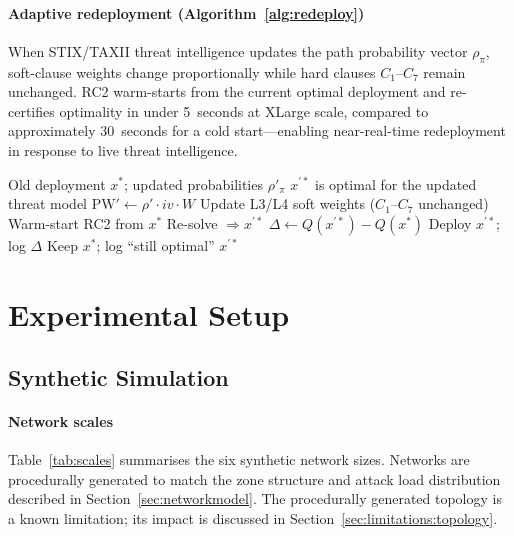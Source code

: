 \documentclass[journal]{IEEEtran}
\begin{document}
\paragraph{Adaptive redeployment (Algorithm~\ref{alg:redeploy})}
When STIX/TAXII threat intelligence updates the path probability
vector $\rho_\pi$, soft-clause weights change proportionally while
hard clauses $C_1$--$C_7$ remain unchanged. RC2 warm-starts from
the current optimal deployment and re-certifies optimality in under
5~seconds at XLarge scale, compared to approximately 30~seconds for
a cold start---enabling near-real-time redeployment in response to
live threat intelligence.

\begin{algorithm}
\caption{Adaptive Redeployment on Updated Threat Priors}
\label{alg:redeploy}
\begin{algorithmic}[1]
\REQUIRE Old deployment $x^*$; updated probabilities $\rho'_\pi$
\ENSURE $x^{\prime*}$ is optimal for the updated threat model
\STATE $\mathrm{PW}'\leftarrow\rho'\cdot iv\cdot W$
\STATE Update L3/L4 soft weights ($C_1$--$C_7$ unchanged)
\STATE Warm-start RC2 from $x^*$
\STATE Re-solve $\Rightarrow x^{\prime*}$
\STATE $\Delta\leftarrow Q(x^{\prime*})-Q(x^*)$
  \STATE Deploy $x^{\prime*}$; log $\Delta$
\ELSE
  \STATE Keep $x^*$; log ``still optimal''
\ENDIF
\RETURN $x^{\prime*}$
\end{algorithmic}
\end{algorithm}

\section{Experimental Setup}
\label{sec:eval}

\subsection{Synthetic Simulation}
\label{sec:eval:sim}

\paragraph{Network scales}
Table~\ref{tab:scales} summarises the six synthetic network sizes.
Networks are procedurally generated to match the zone structure and
attack load distribution described in Section~\ref{sec:networkmodel}.
The procedurally generated topology is a known limitation; its
impact is discussed in Section~\ref{sec:limitations:topology}.
\end{document}
